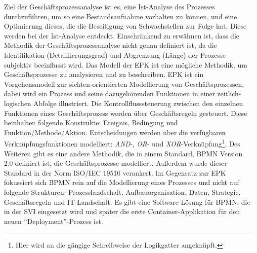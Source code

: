 Ziel der Geschäftsprozessanalyse ist es, eine Ist-Analyse des Prozesses durchzuführen, um so eine Bestandsaufnahme vorhalten zu können, und eine Optimierung dieses, die die Beseitigung von Schwachstellen zur Folge hat. Diese werden bei der Ist-Analyse entdeckt. Einschränkend zu erwähnen ist, dass die Methodik der Geschäftsprozessanalyse nicht genau definiert ist, da die Identifikation (Detaillierungsgrad) und Abgrenzung (Länge) der Prozesse subjektiv beeinflusst wird. Das Modell der \ac{EPK} ist eine mögliche Methodik, um Geschäftsprozesse zu analysieren und zu beschreiben.\autocite[vgl.][S.\,59]{staud_geschaftsprozessanalyse_2006} \ac{EPK} ist ein Vorgehensmodell zur sichten-orientierten Modellierung von Geschäftsprozessen, dabei wird ein Prozess und seine dazugehörenden Funktionen in einer zeitlich-logischen Abfolge illustriert.\autocite[vgl.][S.\,4]{scheer_objektorientierte_1997} Die Kontrollflusssteuerung zwischen den einzelnen Funktionen eines Geschäftsprozess werden über Geschäftsregeln gesteuert. Diese beinhalten folgende Konstrukte: Ereignis, Bedingung und Funktion/Methode/Aktion. Entscheidungen werden über die verfügbaren Verknüpfungsfunktionen modelliert:\autocite[vgl.][S.\,4]{scheer_objektorientierte_1997} \textit{AND}-, \textit{OR}- und \textit{XOR}-Verknüpfung\footnote{Hier wird an die gängige Schreibweise der Logikgatter angeknüpft.}. Des Weiteren gibt es eine andere Methodik, die in einem Standard, \ac{BPMN} Version 2.0 \autocite{object_management_group_omg_business_2011} definiert ist, die Geschäftsprozesse modelliert. Außerdem wurde dieser Standard in der Norm ISO/IEC 19510 verankert.\autocite{ict1_information_2020} Im Gegensatz zur \ac{EPK} fokussiert sich \ac{BPMN} rein auf die Modellierung eines Prozesses und nicht auf folgende Strukturen: Prozesslandschaft, Aufbauorganisation, Daten, Strategie, Geschäftsregeln und IT-Landschaft.\autocite[vgl.][S.\,28]{freund_praxishandbuch_2017} Es gibt eine Software-Lösung für \ac{BPMN}, die in der \ac{SVI} eingesetzt wird und später die erste Container-Applikation für den neuen \enquote{Deployment}-Prozess ist.

